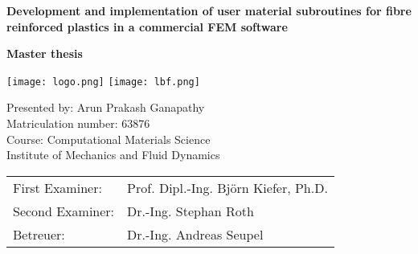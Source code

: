 \begin{titlepage}
	
	\begin{center}
	  	
	  	\vspace*{0.4cm}
	  	
	  	\Large{ \textbf{Development and implementation of user material subroutines for fibre reinforced plastics in a commercial FEM software} }
	  	
	  	\vspace{0.5cm}
	  	
	  	\Large{ \textbf{Master thesis}}
	  	
	  	\vspace{1cm}
	  	
	 \begin{center} \hspace*{0.8cm}	\texttt{[image: logo.png]} \hspace*{0.8cm} \vspace{1cm} \centering \texttt{[image: lbf.png]} \end{center}
	
	   \vspace{0.5cm}
	   
	 \large { Presented by: Arun Prakash Ganapathy }\\
	  \large { Matriculation number: 63876 } \\
	  \large{Course: Computational Materials Science } \\
	    \large{Institute of Mechanics and Fluid Dynamics}\\
	    	\vspace{1.5cm}
	    	
   \begin{tabular}{l l}

	\vspace{0.2cm}
    \hspace*{1cm} \large{First Examiner:} & \hspace*{1cm}\large{Prof. Dipl.-Ing. Björn Kiefer, Ph.D.}\\
    \vspace{0.2cm}
    \hspace*{1cm} \large{Second Examiner:} & \hspace*{1cm}\large{Dr.-Ing. Stephan Roth}\\
	\vspace{0.2cm}
    \hspace*{1cm} \large{Betreuer:} & \hspace*{1cm}\large{Dr.-Ing. Andreas Seupel} \\


\end{tabular}
\end{center}
\end{titlepage}
